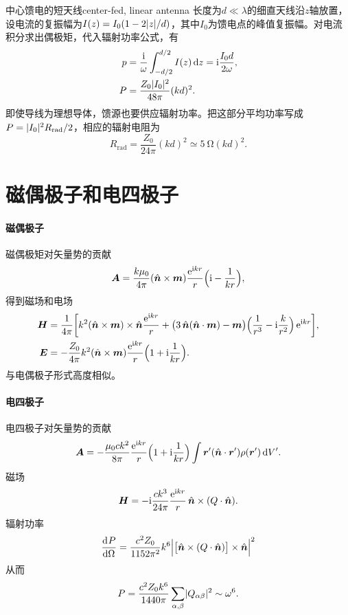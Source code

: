 \begin{example}{中心馈电的短天线}{center-fed, linear antenna}
    长度为$d \ll \lambda$的细直天线沿$z$轴放置，设电流的复振幅为$I(z) = I_0(1 - 2\lvert z\rvert/d)$，其中$I_0$为馈电点的峰值复振幅。对电流积分求出偶极矩，代入辐射功率公式，有
    \begin{align*}
        p &= \frac{\mathrm{i}}{\omega}\int_{-d/2}^{d/2}I(z)\mathop{}\!\mathrm{d} z = \mathrm{i}\frac{I_0d}{2\omega},\\
        P &= \frac{Z_0\lvert I_0\rvert^2}{48\pi}(kd)^2.
    \end{align*}
    即使导线为理想导体，馈源也要供应辐射功率。把这部分平均功率写成$P = \lvert I_0\rvert^2R_\mathrm{rad}/2$，相应的辐射电阻为
    \begin{equation}
        \label{eq:ed-short-antenna-resistance}
        R_\mathrm{rad} = \frac{Z_0}{24\pi}(kd)^2 \simeq \qty{5}{\ohm}(kd)^2.
    \end{equation}
\end{example}
\section{磁偶极子和电四极子}
\paragraph{磁偶极子}
磁偶极矩对矢量势的贡献
\[
    \bm A = \frac{k\mu_0}{4\pi}(\mathop{}\!\hat{\bm{n}} \times \bm m)\frac{\mathop{}\!\mathrm{e}^{\mathrm{i} kr}}r\Bigl(\mathrm{i} - \frac1{kr}\Bigr),
\]
得到磁场和电场
\begin{subequations}
    \label{eq:ed-magnetic-dipole-radiation-fields}
    \begin{align}
        \bm H &= \frac1{4\pi}\biggb{k^2(\uvec n \times \bm m) \times \uvec n\frac{\e^{\i kr}}r + \bigp{3\uvec n(\uvec n \cdot \bm m) - \bm m}\Bigp{\frac1{r^3} - \i\frac{k}{r^2}}\e^{\i kr}},\\
        \bm E &= -\frac{Z_0}{4\pi}k^2(\uvec n \times \bm m)\frac{\e^{\i kr}}r\Bigp{1 + \i\frac1{ kr}}.
    \end{align}
\end{subequations}
与电偶极子形式高度相似。
\paragraph{电四极子}
电四极子对矢量势的贡献
\[
    \bm A = -\frac{\mu_0ck^2}{8\pi}\frac{\mathop{}\!\mathrm{e}^{\mathrm{i} kr}}r\Bigl(1 + \mathrm{i}\frac1{kr}\Bigr)\int\bm r'(\mathop{}\!\hat{\bm{n}} \cdot \bm r')\rho(\bm r')\mathop{}\!\mathrm{d} V'.
\]
磁场
\[
    \bm H = -\mathrm{i}\frac{ck^3}{24\pi}\frac{\mathop{}\!\mathrm{e}^{\mathrm{i} kr}}r\mathop{}\!\hat{\bm{n}} \times (Q \cdot \mathop{}\!\hat{\bm{n}}).
\]
辐射功率 
\begin{equation}
    \label{eq:ed-quadrupole-angular-power}
    \frac{\mathop{}\!\mathrm{d}^{}P}{\mathrm{d}{\Omega}^{}} = \frac{c^2Z_0}{1152\pi^2}k^6\Bigl\lvert\bigl[\mathop{}\!\hat{\bm{n}} \times (Q \cdot \mathop{}\!\hat{\bm{n}})\bigr] \times \mathop{}\!\hat{\bm{n}}\Bigr\rvert^2
\end{equation}
从而 
\begin{equation}
    \label{eq:ed-quadrupole-total-power}
    P = \frac{c^2Z_0k^6}{1440\pi}\sum_{\alpha,\beta}\lvert Q_{\alpha\beta}\rvert^2 \sim \omega^6.
\end{equation}

